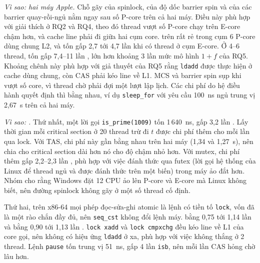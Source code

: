 \emph{Vì sao: hai máy Apple.} Chỗ gãy của spinlock, của độ dốc barrier spin và của các barrier
quay-rồi-ngủ nằm ngay sau số P-core trên cả hai máy. Điều này phù hợp với giải thích ở RQ2 và RQ4, theo đó
thread vượt số P-core chạy trên E-core chậm hơn, và cache line phải đi giữa hai cụm core. 
trên  rất rẻ trong cụm 6 P-core dùng chung L2, và tốn gấp 2,7 tới 4,7 lần khi có
thread ở cụm E-core. Ở 4--6 thread,  tốn gấp 7,4--11 lần , lớn hơn khoảng 3 lần
mức mô hình $1+f$ của RQ5. Khoảng chênh này phù hợp với giả thuyết của RQ5 rằng \texttt{ldadd} được thực
hiện ở cache dùng chung, còn CAS phải kéo line về L1. MCS và barrier spin sụp khi vượt số core, vì thread
chờ phải đợi một lượt lập lịch. Các chi phí do hệ điều hành quyết định thì bằng nhau, ví dụ
\texttt{sleep\_for} với yêu cầu 100~ns ngủ trung vị 2,67~\textmu s trên cả hai máy.

\emph{Vì sao: .} Thứ nhất, một lời gọi \texttt{is\_prime(1009)} tốn 1\,640~ns, gấp 3,2
lần . Lấy thời gian mỗi critical section ở 20 thread trừ đi $t$ được chi phí thêm cho
mỗi lần qua lock. Với TAS, chi phí này gần bằng nhau trên hai máy (1,34 và 1,27~\textmu s), nên chia cho
critical section dài hơn nó cho độ chậm nhỏ hơn. Với mutex, chi phí thêm gấp 2,2--2,3 lần
, phù hợp với việc đánh thức qua futex (lời gọi hệ thống của Linux để thread ngủ và được
đánh thức trên một biến) trong máy ảo đắt hơn. Nhóm cho rằng Windows đặt
12 CPU ảo lên P-core và E-core mà Linux không biết, nên đường spinlock không gãy ở một số thread cố định.

Thứ hai, trên x86-64 mọi phép đọc-sửa-ghi atomic là lệnh có tiền tố \texttt{lock}, vốn đã là một rào
chắn đầy đủ, nên \texttt{seq\_cst} không đổi lệnh máy.  bằng 0,75 tới 1,14 lần
 và  bằng 0,90 tới 1,13 lần . \texttt{lock xadd} và \texttt{lock cmpxchg} đều kéo line về L1 của core gọi, nên không có
hiệu ứng \texttt{ldadd} ở xa, phù hợp với việc  không thắng  ở 2 thread. Lệnh
\texttt{pause} tốn trung vị 51~ns, gấp 4 lần \texttt{isb}, nên mỗi lần CAS hỏng chờ lâu hơn.


